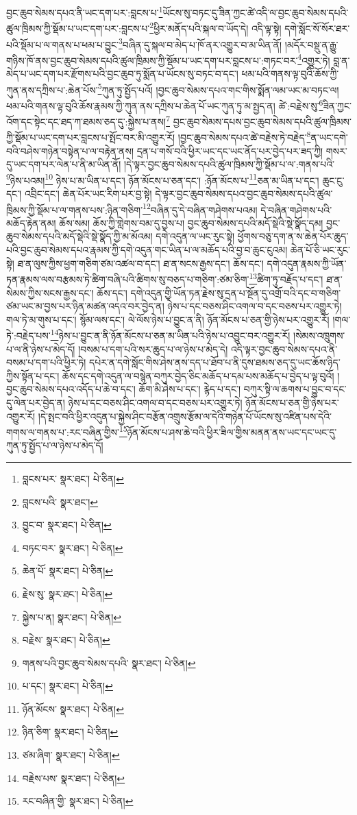 བྱང་ཆུབ་སེམས་དཔའ་ནི་ཡང་དག་པར་:བླངས་པ་\footnote{བླངས་པར་  སྣར་ཐང་།  པེ་ཅིན། }ཡོངས་སུ་བཏང་དུ་ཟིན་ཀྱང་ཚེ་འདི་ལ་བྱང་ཆུབ་སེམས་དཔའི་ཚུལ་ཁྲིམས་ཀྱི་སྡོམ་པ་ཡང་དག་པར་:བླངས་པ་\footnote{བླངས་པའི་  སྣར་ཐང་། }ཕྱིར་མནོད་པའི་སྐལ་བ་ཡོད་དེ། འདི་ལྟ་སྟེ། དགེ་སློང་སོ་སོར་ཐར་པའི་སྡོམ་པ་ལ་གནས་པ་ཕམ་པ་བྱུང་\footnote{བྱུང་བ་  སྣར་ཐང་།  པེ་ཅིན། }བཞིན་དུ་སྐལ་བ་མེད་པ་ཁོ་ནར་འགྱུར་བ་མ་ཡིན་ནོ། །མདོར་བསྡུ་ན་རྒྱུ་གཉིས་ཁོ་ནས་བྱང་ཆུབ་སེམས་དཔའི་ཚུལ་ཁྲིམས་ཀྱི་སྡོམ་པ་ཡང་དག་པར་བླངས་པ་:གཏང་བར་\footnote{བཏང་བར་  སྣར་ཐང་།  པེ་ཅིན། }འགྱུར་ཏེ། བླ་ན་མེད་པ་ཡང་དག་པར་རྫོགས་པའི་བྱང་ཆུབ་ཏུ་སྨོན་པ་ཡོངས་སུ་བཏང་བ་དང་། ཕམ་པའི་གནས་ལྟ་བུའི་ཆོས་ཀྱི་ཀུན་ནས་དཀྲིས་པ་:ཆེན་པོས་\footnote{ཆེན་པོ་  སྣར་ཐང་།  པེ་ཅིན། }ཀུན་ཏུ་སྤྱོད་པའོ། །བྱང་ཆུབ་སེམས་དཔའ་གང་གིས་སྨོན་ལམ་ཡང་མ་བཏང་ལ། ཕམ་པའི་གནས་ལྟ་བུའི་ཆོས་རྣམས་ཀྱི་ཀུན་ནས་དཀྲིས་པ་ཆེན་པོ་ཡང་ཀུན་ཏུ་མ་སྤྱད་ན། ཚེ་:བརྗེས་སུ་\footnote{རྗེས་སུ་  སྣར་ཐང་།  པེ་ཅིན། }ཟིན་ཀྱང་འོག་དང་སྟེང་དང་ཐད་ཀ་ཐམས་ཅད་དུ་:སྐྱེས་པ་ནས།\footnote{སྐྱེས་པ་ན།  སྣར་ཐང་།  པེ་ཅིན། } བྱང་ཆུབ་སེམས་དཔས་བྱང་ཆུབ་སེམས་དཔའི་ཚུལ་ཁྲིམས་ཀྱི་སྡོམ་པ་ཡང་དག་པར་བླངས་པ་སྤོང་བར་མི་འགྱུར་རོ། །བྱང་ཆུབ་སེམས་དཔའ་ཚེ་བརྗེས་ཏེ་བརྗེད་\footnote{བརྗེས་  སྣར་ཐང་།  པེ་ཅིན། }ན་ཡང་དགེ་བའི་བཤེས་གཉེན་བསྟེན་པ་ལ་བརྟེན་ནས། དྲན་པ་གསོ་བའི་ཕྱིར་ཡང་དང་ཡང་ནོད་པར་བྱེད་པར་ཟད་ཀྱི། གསར་དུ་ཡང་དག་པར་ལེན་པ་ནི་མ་ཡིན་ནོ། །དེ་ལྟར་བྱང་ཆུབ་སེམས་དཔའི་ཚུལ་ཁྲིམས་ཀྱི་སྡོམ་པ་ལ་:གནས་པའི་\footnote{གནས་པའི་བྱང་ཆུབ་སེམས་དཔའི་  སྣར་ཐང་།  པེ་ཅིན། }ཉེས་པའམ།\footnote{པ་དང་།  སྣར་ཐང་།  པེ་ཅིན། } ཉེས་པ་མ་ཡིན་པ་དང་། ཉོན་མོངས་པ་ཅན་དང་། :ཉོན་མོངས་པ་\footnote{ཉོན་མོངས་  སྣར་ཐང་།  པེ་ཅིན། }ཅན་མ་ཡིན་པ་དང་། ཆུང་ངུ་དང་། འབྲིང་དང་། ཆེན་པོར་ཡང་རིག་པར་བྱ་སྟེ། དེ་ལྟར་བྱང་ཆུབ་སེམས་དཔའ་བྱང་ཆུབ་སེམས་དཔའི་ཚུལ་ཁྲིམས་ཀྱི་སྡོམ་པ་ལ་གནས་པས་:ཉིན་གཅིག་\footnote{ཉིན་ཅིག་  སྣར་ཐང་།  པེ་ཅིན། }བཞིན་དུ་དེ་བཞིན་གཤེགས་པའམ། དེ་བཞིན་གཤེགས་པའི་མཆོད་རྟེན་ནམ། ཆོས་སམ། ཆོས་ཀྱི་གླེགས་བམ་དུ་བྱས་པ། བྱང་ཆུབ་སེམས་དཔའི་མདོ་སྡེའི་སྡེ་སྣོད་དམ། བྱང་ཆུབ་སེམས་དཔའི་མདོ་སྡེའི་སྡེ་སྣོད་ཀྱི་མ་མོའམ། དགེ་འདུན་ལ་ཡང་རུང་སྟེ། ཕྱོགས་བཅུ་དག་ན་ས་ཆེན་པོར་ཆུད་པའི་བྱང་ཆུབ་སེམས་དཔའ་རྣམས་ཀྱི་དགེ་འདུན་གང་ཡིན་པ་ལ་མཆོད་པའི་བྱ་བ་ཆུང་ངུའམ། ཆེན་པོ་ཅི་ཡང་རུང་སྟེ། ཐ་ན་ལུས་ཀྱིས་ཕྱག་གཅིག་ཙམ་འཚལ་བ་དང་། ཐ་ན་སངས་རྒྱས་དང་། ཆོས་དང་། དགེ་འདུན་རྣམས་ཀྱི་ཡོན་ཏན་རྣམས་ལས་བརྩམས་ཏེ་ཚིག་བཞི་པའི་ཚིགས་སུ་བཅད་པ་གཅིག་:ཙམ་ཅིག་\footnote{ཙམ་ཞིག་  སྣར་ཐང་།  པེ་ཅིན། }ཚིག་ཏུ་བརྗོད་པ་དང་། ཐ་ན་སེམས་ཀྱིས་སངས་རྒྱས་དང་། ཆོས་དང་། དགེ་འདུན་གྱི་ཡོན་ཏན་རྗེས་སུ་དྲན་པ་སྔོན་དུ་འགྲོ་བའི་དང་བ་གཅིག་ཙམ་ཡང་མ་བྱས་པར་ཉིན་མཚན་འདའ་བར་བྱེད་ན། ཉེས་པ་དང་བཅས་ཤིང་འགལ་བ་དང་བཅས་པར་འགྱུར་ཏེ། གལ་ཏེ་མ་གུས་པ་དང་། སྙོམ་ལས་དང་། ལེ་ལོས་ཉེས་པ་བྱུང་ན་ནི། ཉོན་མོངས་པ་ཅན་གྱི་ཉེས་པར་འགྱུར་རོ། །གལ་ཏེ་:བརྗེད་པས་\footnote{བརྗེས་པས་  སྣར་ཐང་།  པེ་ཅིན། }ཉེས་པ་བྱུང་ན་ནི་ཉོན་མོངས་པ་ཅན་མ་ཡིན་པའི་ཉེས་པ་འབྱུང་བར་འགྱུར་རོ། །སེམས་འཁྲུགས་པ་ལ་ནི་ཉེས་པ་མེད་དོ། །བསམ་པ་དག་པའི་སར་ཆུད་པ་ལ་ཉེས་པ་མེད་དེ། འདི་ལྟར་བྱང་ཆུབ་སེམས་དཔའ་ནི་བསམ་པ་དག་པའི་ཕྱིར་ཏེ། དཔེར་ན་དགེ་སློང་གིས་ཤེས་ནས་དད་པ་ཐོབ་པ་ནི་དུས་ཐམས་ཅད་དུ་ཡང་ཆོས་ཉིད་ཀྱིས་སྟོན་པ་དང་། ཆོས་དང་དགེ་འདུན་ལ་བསྙེན་བཀུར་བྱེད་ཅིང་མཆོད་པ་དམ་པས་མཆོད་པ་བྱེད་པ་ལྟ་བུའོ། །བྱང་ཆུབ་སེམས་དཔའ་འདོད་པ་ཆེ་བ་དང་། ཆོག་མི་ཤེས་པ་དང་། རྙེད་པ་དང་། བཀུར་སྟི་ལ་ཆགས་པ་བྱུང་བ་དང་དུ་ལེན་པར་བྱེད་ན། ཉེས་པ་དང་བཅས་ཤིང་འགལ་བ་དང་བཅས་པར་འགྱུར་ཏེ། ཉོན་མོངས་པ་ཅན་གྱི་ཉེས་པར་འགྱུར་རོ། །དེ་སྤང་བའི་ཕྱིར་འདུན་པ་སྐྱེས་ཤིང་བརྩོན་འགྲུས་རྩོམ་ལ་དེའི་གཉེན་པོ་ཡོངས་སུ་འཛིན་པས་དེའི་གགས་ལ་གནས་པ་:རང་བཞིན་གྱིས་\footnote{རང་བཞིན་གྱི་  སྣར་ཐང་།  པེ་ཅིན། }ཉོན་མོངས་པ་ཤས་ཆེ་བའི་ཕྱིར་ཟིལ་གྱིས་མནན་ནས་ཡང་དང་ཡང་དུ་ཀུན་ཏུ་སྤྱོད་པ་ལ་ཉེས་པ་མེད་དོ། 